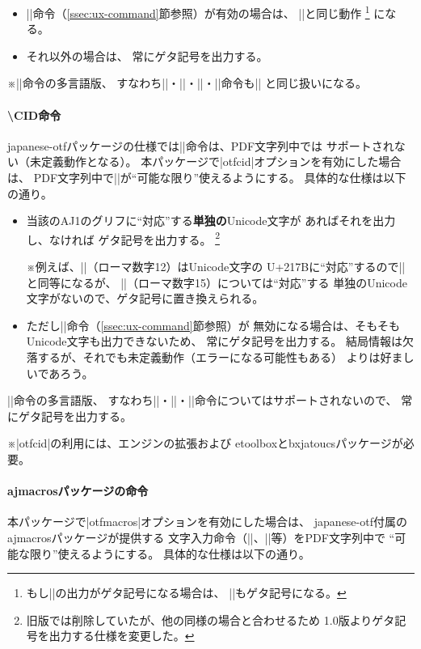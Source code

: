 \documentclass[uplatex,dvipdfmx,a4paper]{jsarticle}
\newcommand{\Pkg}[1]{\textsf{#1}}
\newcommand{\Note}{\par\noindent ※}
\newcommand{\／}{\mbox{}／\mbox{}}
\begin{document}
\begin{itemize}
\item |\Ux|命令（\ref{ssec:ux-command}節参照）が有効の場合は、
  |\Ux|と同じ動作
  \footnote{もし|\Ux|の出力がゲタ記号になる場合は、
    |\UTF|もゲタ記号になる。}%
  になる。
\item それ以外の場合は、
  常にゲタ記号を出力する。
\end{itemize}

\Note |\UTF|命令の多言語版、
すなわち|\UTFC|・|\UTFK|・|\UTFM|・|\UTFT|命令も|\UTF|%
と同じ扱いになる。

\paragraph{\textbackslash CID命令}
\Pkg{japanese-otf}パッケージの仕様では|\CID|命令は、PDF文字列中では
サポートされない（未定義動作となる）。
本パッケージで|otfcid|オプションを有効にした場合は、
PDF文字列中で|\CID|が“可能な限り”使えるようにする。
具体的な仕様は以下の通り。

\begin{itemize}
\item 当該のAJ1のグリフに“対応”する\textbf{単独の}Unicode文字が
  あればそれを出力し、なければ
  ゲタ記号を出力する。
  \footnote{旧版では削除していたが、他の同様の場合と合わせるため
    1.0版よりゲタ記号を出力する仕様を変更した。}
  \Note 例えば、||（ローマ数字12）はUnicode文字の
  U+217Bに“対応”するので||と同等になるが、
  ||（ローマ数字15）については“対応”する
  単独のUnicode文字がないので、ゲタ記号に置き換えられる。
\item ただし|\Ux|命令（\ref{ssec:ux-command}節参照）が
  無効になる場合は、そもそもUnicode文字も出力できないため、
  常にゲタ記号を出力する。
  結局情報は欠落するが、それでも未定義動作（エラーになる可能性もある）
  よりは好ましいであろう。
\end{itemize}

|\CID|命令の多言語版、
すなわち|\CIDC|・|\CIDK|・|\CIDT|命令についてはサポートされないので、
常にゲタ記号を出力する。

\Note |otfcid|の利用には、エンジンの{\eTeX}拡張および
\Pkg{etoolbox}と\Pkg{bxjatoucs}パッケージが必要。

\paragraph{ajmacrosパッケージの命令}
本パッケージで|otfmacros|オプションを有効にした場合は、
\Pkg{japanese-otf}付属の\Pkg{ajmacros}パッケージが提供する
文字入力命令（|\ajMaru|、|\ajLig|等）をPDF文字列中で
“可能な限り”使えるようにする。
具体的な仕様は以下の通り。
\end{document}

